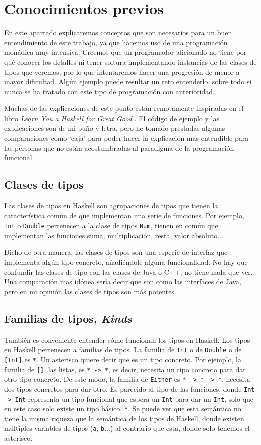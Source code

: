 \documentclass[class=article, crop=false]{standalone}
\begin{document}
\section{Conocimientos previos}\label{sec:con_prev}
En este apartado explicaremos conceptos que son necesarios para un buen entendimiento de este
trabajo, ya que hacemos uso de una programación monádica muy intensiva. Creemos que un
programador aficionado no tiene por qué conocer los detalles ni tener soltura implementando
instancias de las clases de tipos que veremos, por lo que intentaremos hacer una progresión
de menor a mayor dificultad. Algún ejemplo puede resultar un reto entenderlo, sobre todo si
nunca se ha tratado con este tipo de programación con anterioridad.

Muchas de las explicaciones de este punto están remotamente inspiradas en el libro\textit{
Learn You a Haskell for Great Good} \cite{Lipovaca:2011:LYH:2018642}. El código de ejemplo y
las explicaciones son de mi puño y letra, pero he tomado prestadas algunas comparaciones como
`caja' para poder hacer la explicación mas entendible para las personas que no están
acostumbradas al paradigma de la programación funcional.

\subsection{Clases de tipos}
Las clases de tipos en Haskell son agrupaciones de tipos que tienen la característica común
de que implementan una serie de funciones. Por ejemplo, \verb`Int` o \verb`Double` pertenecen
a la clase de tipos \verb`Num`, tienen en común que implementan las funciones suma,
multiplicación, resta, valor absoluto...

Dicho de otra manera, las clases de tipos son una especie de interfaz que implementa algún
tipo concreto, añadiéndole alguna funcionalidad. No hay que confundir las clases de tipo con
las clases de Java o C++, no tiene nada que ver. Una comparación mas idónea sería decir que
son como las interfaces de Java, pero en mi opinión las clases de tipos son más potentes.

\subsection{Familias de tipos, \textit{Kinds}}
También es conveniente entender cómo funcionan los tipos en Haskell. Los tipos en Haskell
pertenecen a familias de tipos. La familia de \verb`Int` o de \verb`Double` o de \verb`[Int]`
es \verb`*`. Un asterisco quiere decir que es un tipo concreto. Por ejemplo, la familia de
\verb`[]`, las listas, es \verb`* -> *`, es decir, necesita un tipo concreto para dar otro
tipo concreto. De este modo, la familia de \verb`Either` es \verb`* -> * -> *`, necesita dos
tipos concretos para dar otro. Es parecido al tipo de las funciones, donde \verb`Int -> Int`
representa un tipo funcional que espera un \verb`Int` para dar un \verb`Int`, solo que en
este caso solo existe un tipo básico, \verb`*`. Se puede ver que esta semántica no tiene la
misma riqueza que la semántica de los tipos de Haskell, donde existen múltiples variables de
tipos (\verb`a`, \verb`b`...) al contrario que esta, donde solo tenemos el asterisco.
\end{document}
